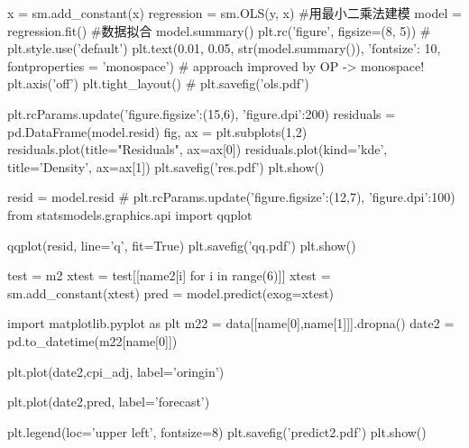 \documentclass[a4paper,AutoFakeBold,AutoFakeSlant]{ctexart}
\begin{document}
\begin{python}
x = sm.add_constant(x)
regression = sm.OLS(y, x) #用最小二乘法建模
model = regression.fit() #数据拟合
model.summary()
plt.rc('figure', figsize=(8, 5))
# plt.style.use('default')
plt.text(0.01, 0.05, str(model.summary()), {'fontsize': 10}, fontproperties = 'monospace') # approach improved by OP -> monospace!
plt.axis('off')
plt.tight_layout()
# plt.savefig('ols.pdf')

plt.rcParams.update({'figure.figsize':(15,6), 'figure.dpi':200})
residuals = pd.DataFrame(model.resid)
fig, ax = plt.subplots(1,2)
residuals.plot(title="Residuals", ax=ax[0])
residuals.plot(kind='kde', title='Density', ax=ax[1])
plt.savefig('res.pdf')
plt.show()

resid = model.resid
# plt.rcParams.update({'figure.figsize':(12,7), 'figure.dpi':100})
from statsmodels.graphics.api import qqplot

qqplot(resid, line='q', fit=True)
plt.savefig('qq.pdf')
plt.show()

test = m2
xtest = test[[name2[i] for i in range(6)]]
xtest = sm.add_constant(xtest)
pred = model.predict(exog=xtest)

import matplotlib.pyplot as plt
m22 = data[[name[0],name[1]]].dropna()
date2 = pd.to_datetime(m22[name[0]])

plt.plot(date2,cpi_adj, label='oringin')

plt.plot(date2,pred, label='forecast')

plt.legend(loc='upper left', fontsize=8)
plt.savefig('predict2.pdf')
plt.show()
\end{python}

% 


\end{document}
